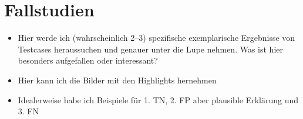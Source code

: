 \section{Fallstudien}\label{sec:fallstudien}

\begin{itemize}
    \item Hier werde ich (wahrscheinlich 2--3) spezifische exemplarische Ergebnisse von Testcases heraussuchen und genauer unter die Lupe nehmen. Was ist hier besonders aufgefallen oder interessant?
    \item Hier kann ich die Bilder mit den Highlights hernehmen
    \item Idealerweise habe ich Beispiele für 1. TN, 2. FP aber plausible Erklärung und 3. FN
\end{itemize}